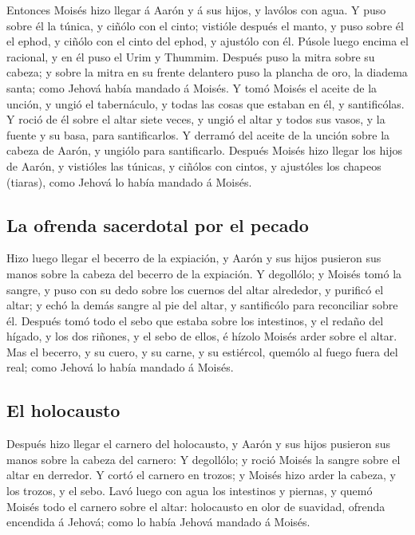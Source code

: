  Entonces Moisés hizo llegar á Aarón y á sus hijos, y
lavólos con agua.  Y puso sobre él la túnica, y ciñólo con
el cinto; vistióle después el manto, y puso sobre él el ephod, y ciñólo
con el cinto del ephod, y ajustólo con él.  Púsole luego
encima el racional, y en él puso el Urim y Thummim.  Después
puso la mitra sobre su cabeza; y sobre la mitra en su frente delantero
puso la plancha de oro, la diadema santa; como Jehová había mandado á
Moisés.  Y tomó Moisés el aceite de la unción, y ungió el
tabernáculo, y todas las cosas que estaban en él, y santificólas.
 Y roció de él sobre el altar siete veces, y ungió el altar
y todos sus vasos, y la fuente y su basa, para santificarlos.
 Y derramó del aceite de la unción sobre la cabeza de
Aarón, y ungiólo para santificarlo.  Después Moisés hizo
llegar los hijos de Aarón, y vistióles las túnicas, y ciñólos con
cintos, y ajustóles los chapeos (tiaras), como Jehová lo había mandado á
Moisés.

\hypertarget{la-ofrenda-sacerdotal-por-el-pecado}{%
\subsection{La ofrenda sacerdotal por el
pecado}\label{la-ofrenda-sacerdotal-por-el-pecado}}

 Hizo luego llegar el becerro de la expiación, y Aarón y
sus hijos pusieron sus manos sobre la cabeza del becerro de la
expiación.  Y degollólo; y Moisés tomó la sangre, y puso
con su dedo sobre los cuernos del altar alrededor, y purificó el altar;
y echó la demás sangre al pie del altar, y santificólo para reconciliar
sobre él.  Después tomó todo el sebo que estaba sobre los
intestinos, y el redaño del hígado, y los dos riñones, y el sebo de
ellos, é hízolo Moisés arder sobre el altar.  Mas el
becerro, y su cuero, y su carne, y su estiércol, quemólo al fuego fuera
del real; como Jehová lo había mandado á Moisés.

\hypertarget{el-holocausto}{%
\subsection{El holocausto}\label{el-holocausto}}

 Después hizo llegar el carnero del holocausto, y Aarón y
sus hijos pusieron sus manos sobre la cabeza del carnero: 
Y degollólo; y roció Moisés la sangre sobre el altar en derredor.
 Y cortó el carnero en trozos; y Moisés hizo arder la
cabeza, y los trozos, y el sebo.  Lavó luego con agua los
intestinos y piernas, y quemó Moisés todo el carnero sobre el altar:
holocausto en olor de suavidad, ofrenda encendida á Jehová; como lo
había Jehová mandado á Moisés.

